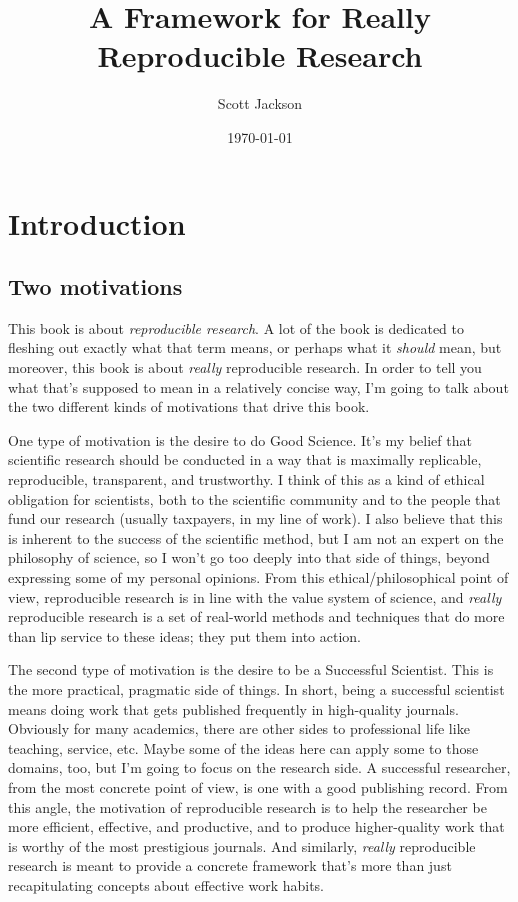 \documentclass{book}
\title{A Framework for Really Reproducible Research}
\author{Scott Jackson}
\date{\today}
\begin{document}
\maketitle

\setcounter{tocdepth}{3}
\tableofcontents
\vspace*{1cm}

\chapter{Introduction}
\label{sec-1}
\label{intro}
\section{Two motivations}
\label{sec-1-1}

This book is about \emph{reproducible research}. A lot of the book is dedicated to fleshing out exactly what that term means, or perhaps what it \emph{should} mean, but moreover, this book is about \emph{really} reproducible research.  In order to tell you what that's supposed to mean in a relatively concise way, I'm going to talk about the two different kinds of motivations that drive this book.

One type of motivation is the desire to do Good Science.  It's my belief that scientific research should be conducted in a way that is maximally replicable, reproducible, transparent, and trustworthy.  I think of this as a kind of ethical obligation for scientists, both to the scientific community and to the people that fund our research (usually taxpayers, in my line of work).  I also believe that this is inherent to the success of the scientific method, but I am not an expert on the philosophy of science, so I won't go too deeply into that side of things, beyond expressing some of my personal opinions.  From this ethical/philosophical point of view, reproducible research is in line with the value system of science, and \emph{really} reproducible research is a set of real-world methods and techniques that do more than lip service to these ideas; they put them into action.

The second type of motivation is the desire to be a Successful Scientist.  This is the more practical, pragmatic side of things. In short, being a successful scientist means doing work that gets published frequently in high-quality journals.  Obviously for many academics, there are other sides to professional life like teaching, service, etc.  Maybe some of the ideas here can apply some to those domains, too, but I'm going to focus on the research side. A successful researcher, from the most concrete point of view, is one with a good publishing record.  From this angle, the motivation of reproducible research is to help the researcher be more efficient, effective, and productive, and to produce higher-quality work that is worthy of the most prestigious journals. And similarly, \emph{really} reproducible research is meant to provide a concrete framework that's more than just recapitulating concepts about effective work habits.
\end{document}

